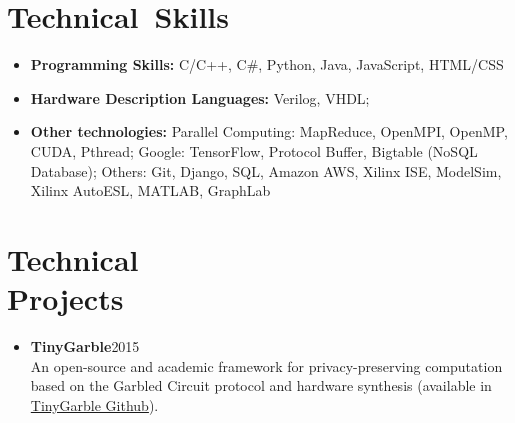 \documentclass[overlapped]{res}
\begin{document}
\begin{resume}
\section{Technical\ Skills}
\begin{itemize}
\item {\bf Programming Skills:} C/C++, C\#, Python, Java, JavaScript, HTML/CSS
\item {\bf Hardware Description Languages:} Verilog, VHDL;
\item {\bf Other technologies:}
Parallel Computing: MapReduce, OpenMPI, OpenMP, CUDA, Pthread;
Google: TensorFlow, Protocol Buffer, Bigtable (NoSQL Database);
Others: Git, Django, SQL, Amazon AWS, Xilinx ISE, ModelSim, Xilinx AutoESL, MATLAB,
GraphLab
\end{itemize}

\section{Technical\\ Projects}
\begin{itemize}
\item {\bf TinyGarble}\hfill 2015\\
An open-source and academic framework for privacy-preserving computation based on the Garbled Circuit protocol and hardware synthesis (available in \href{https://github.com/esonghori/TinyGarble}{TinyGarble Github}).
\end{itemize}


\end{resume}
\end{document}
